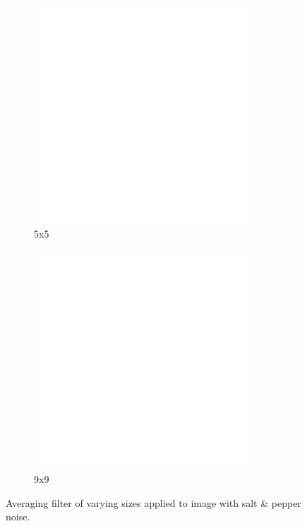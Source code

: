 \begin{figure}[h]
    \begin{subfigure}[b]{0.3\textwidth}
        \includegraphics[width=0.9\textwidth]{../code/2_out/2-1_sp_5x5.png}
        \caption{5x5}
        \label{fig:2-1-1:3}
    \end{subfigure}
    \begin{subfigure}[b]{0.3\textwidth}
        \includegraphics[width=0.9\textwidth]{../code/2_out/2-1_sp_9x9.png}
        \caption{9x9}
        \label{fig:2-1-1:4}
    \end{subfigure}

    \caption{Averaging filter of varying sizes applied to image with salt \& pepper noise.}
    \label{fig:2-1-1}
\end{figure}


